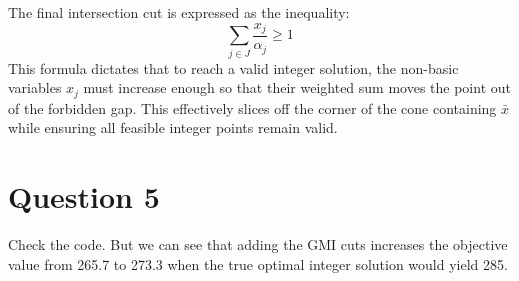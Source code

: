 \documentclass{article}
\begin{document}
    The final intersection cut is expressed as the inequality:
    \[
    \sum_{j \in J} \frac{x_j}{\alpha_j} \ge 1
    \]
    This formula dictates that to reach a valid integer solution, the non-basic variables $x_j$ must increase enough so that their weighted sum moves the point out of the forbidden gap. 
    This effectively slices off the corner of the cone containing $\bar{x}$ while ensuring all feasible integer points remain valid.

\section*{Question 5}
Check the code. But we can see that adding the GMI cuts increases the objective value from 265.7 to 273.3 when the true optimal integer solution would yield 285.
\end{document}
